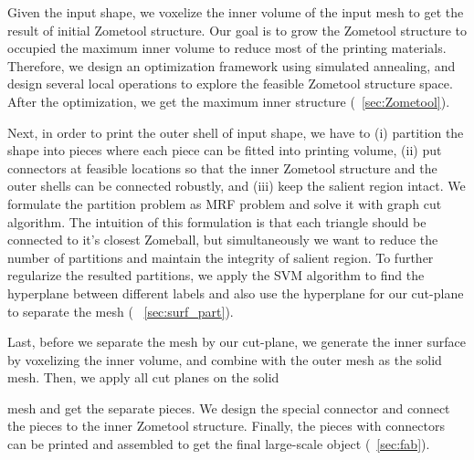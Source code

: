 Given the input shape, we voxelize the inner volume of the input mesh to get the result of  initial Zometool structure.
Our goal is to grow the Zometool structure to occupied the maximum inner volume  to reduce most of the printing materials.
Therefore, we design an optimization framework using simulated annealing, and design several local operations to explore the feasible Zometool structure space.
After the optimization, we get the maximum inner structure (\secname~\ref{sec:Zometool}).

Next, in order to print the outer shell of input shape, we have to (i) partition the shape into pieces where each piece can be fitted into printing volume, (ii) put connectors at feasible locations so that the inner Zometool structure and the outer shells can be connected robustly, and (iii) keep the salient region intact.
We formulate the partition problem as  MRF problem and solve it with graph cut algorithm.
The intuition of this formulation is that each triangle should be connected to it's closest Zomeball, but simultaneously we want to reduce the number of partitions and maintain the integrity of salient region.
To further regularize the resulted partitions, we apply the SVM algorithm to find the hyperplane  between different labels and also use the hyperplane for our cut-plane to separate the mesh ( \secname~\ref{sec:surf_part}).

Last, before we separate the mesh by our cut-plane, we generate the inner surface by voxelizing the inner volume, and combine with the outer mesh as the solid mesh. 
Then, we apply all cut planes on the solid mesh and get the separate pieces. 
We design the special connector and connect the pieces to the inner Zometool structure. 
Finally, the pieces with connectors can be printed and assembled to get the final large-scale object (\secname~\ref{sec:fab}).

